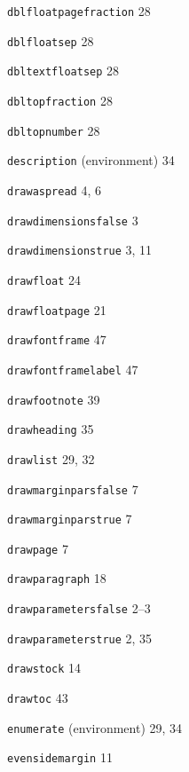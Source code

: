\documentclass[11pt]{article}
\providecommand{\indexfill}{}
\providecommand{\alphaindexspace}[1]{\indexspace{\bfseries #1}}
\begin{document}
\begin{theindex}
\alphaindexspace{D}


\item \texttt  {\bs dblfloatpagefraction}  \indexfill
   28
\item \texttt  {\bs dblfloatsep}  \indexfill
   28
\item \texttt  {\bs dbltextfloatsep}  \indexfill
   28
\item \texttt  {\bs dbltopfraction}  \indexfill
   28
\item \texttt  {\bs dbltopnumber}  \indexfill
   28
\item \texttt  {description} (environment)  \indexfill
   34
\item \texttt  {\bs drawaspread}  \indexfill
   4, 6
\item \texttt  {\bs drawdimensionsfalse}  \indexfill
   3
\item \texttt  {\bs drawdimensionstrue}  \indexfill
   3, 11
\item \texttt  {\bs drawfloat}  \indexfill
   24
\item \texttt  {\bs drawfloatpage}  \indexfill
   21
\item \texttt  {\bs drawfontframe}  \indexfill
   47
\item \texttt  {\bs drawfontframelabel}  \indexfill
   47
\item \texttt  {\bs drawfootnote}  \indexfill
   39
\item \texttt  {\bs drawheading}  \indexfill
   35
\item \texttt  {\bs drawlist}  \indexfill
   29, 32
\item \texttt  {\bs drawmarginparsfalse}  \indexfill
   7
\item \texttt  {\bs drawmarginparstrue}  \indexfill
   7
\item \texttt  {\bs drawpage}  \indexfill
   7
\item \texttt  {\bs drawparagraph}  \indexfill
   18
\item \texttt  {\bs drawparametersfalse}  \indexfill
   2--3
\item \texttt  {\bs drawparameterstrue}  \indexfill
   2, 35
\item \texttt  {\bs drawstock}  \indexfill
   14
\item \texttt  {\bs drawtoc}  \indexfill
   43

\alphaindexspace{E}


\item \texttt  {enumerate} (environment)  \indexfill
   29, 34
\item \texttt  {\bs evensidemargin}  \indexfill
   11


\end{theindex}
\end{document}
